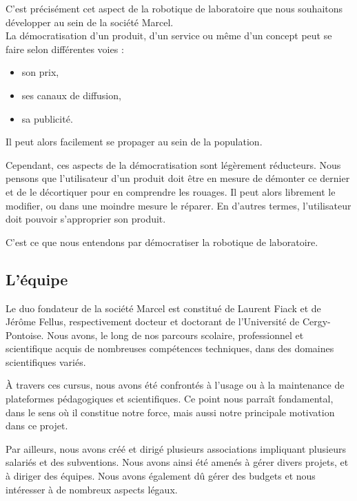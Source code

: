\documentclass[a4paper,12pt]{report}
\begin{document}
C'est précisément cet aspect de la robotique de laboratoire que nous souhaitons développer au sein de la société Marcel.\\

La démocratisation d'un produit, d'un service ou même d'un concept peut se faire selon différentes voies :
\begin{itemize}
	\item son prix,
	\item ses canaux de diffusion,
	\item sa publicité.
\end{itemize}
Il peut alors facilement se propager au sein de la population.

Cependant, ces aspects de la démocratisation sont légèrement réducteurs.
Nous pensons que l'utilisateur d'un produit doit être en mesure de démonter ce dernier et de le décortiquer pour en comprendre les rouages.
Il peut alors librement le modifier, ou dans une moindre mesure le réparer.
En d'autres termes, l'utilisateur doit pouvoir s'approprier son produit.

C'est ce que nous entendons par \og{}démocratiser la robotique de laboratoire\fg{}.

\subsection{L'équipe}
Le duo fondateur de la société Marcel est constitué de Laurent Fiack et de Jérôme Fellus, respectivement docteur et doctorant de l'Université de Cergy-Pontoise.
Nous avons, le long de nos parcours scolaire, professionnel et scientifique acquis de nombreuses compétences techniques, dans des domaines scientifiques variés. 

À travers ces cursus, nous avons été confrontés à l'usage ou à la maintenance de plateformes pédagogiques et scientifiques.
Ce point nous parraît fondamental, dans le sens où il constitue notre force, mais aussi notre principale motivation dans ce projet.

Par ailleurs, nous avons créé et dirigé plusieurs associations impliquant plusieurs salariés et des subventions.
Nous avons ainsi été amenés à gérer divers projets, et à diriger des équipes.
Nous avons également dû gérer des budgets et nous intéresser à de nombreux aspects légaux.\\
\end{document}
